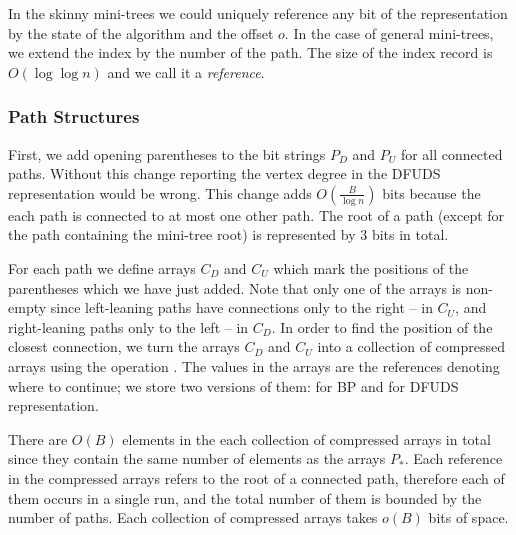 In the skinny mini-trees we could uniquely reference any bit of the representation by the state of the algorithm and the offset $o$.
In the case of general mini-trees, we extend the index by the number of the path.
The size of the index record is $O(\log \log n)$ and we call it a \emph{reference}.

\subsubsection{Path Structures}

First, we add opening parentheses to the bit strings $P_D$ and $P_U$ for all connected paths.
Without this change reporting the vertex degree in the DFUDS representation would be wrong.
This change adds $O\left(\frac{B}{\log n}\right)$ bits because the each path is connected to at most one other path.
The root of a path (except for the path containing the mini-tree root) is represented by $3$ bits in total.

For each path we define arrays $C_D$ and $C_U$ which mark the positions of the parentheses which we have just added.
Note that only one of the arrays is non-empty since left-leaning paths have connections only to the right -- in $C_U$, and right-leaning paths only to the left -- in $C_D$.
In order to find the position of the closest connection, we turn the arrays $C_D$ and $C_U$ into a collection of compressed arrays using the operation \succ{}.
The values in the arrays are the references denoting where to continue; we store two versions of them: for BP and for DFUDS representation.

There are $O(B)$ elements in the each collection of compressed arrays in total since they contain the same number of elements as the arrays $P_*$.
Each reference in the compressed arrays refers to the root of a connected path, therefore each of them occurs in a single run, and the total number of them is bounded by the number of paths.
Each collection of compressed arrays takes $o(B)$ bits of space.


